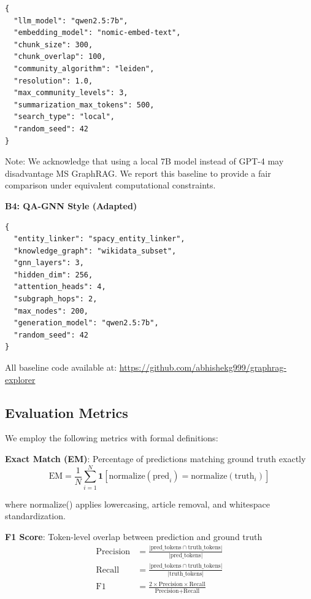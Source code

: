 \documentclass[conference]{IEEEtran}
\begin{document}
\begin{verbatim}
{
  "llm_model": "qwen2.5:7b",
  "embedding_model": "nomic-embed-text",
  "chunk_size": 300,
  "chunk_overlap": 100,
  "community_algorithm": "leiden",
  "resolution": 1.0,
  "max_community_levels": 3,
  "summarization_max_tokens": 500,
  "search_type": "local",
  "random_seed": 42
}
\end{verbatim}

Note: We acknowledge that using a local 7B model instead of GPT-4 may disadvantage MS GraphRAG. We report this baseline to provide a fair comparison under equivalent computational constraints.

\textbf{B4: QA-GNN Style (Adapted)}
\begin{verbatim}
{
  "entity_linker": "spacy_entity_linker",
  "knowledge_graph": "wikidata_subset",
  "gnn_layers": 3,
  "hidden_dim": 256,
  "attention_heads": 4,
  "subgraph_hops": 2,
  "max_nodes": 200,
  "generation_model": "qwen2.5:7b",
  "random_seed": 42
}
\end{verbatim}

All baseline code available at: \url{https://github.com/abhishekg999/graphrag-explorer}

\subsection{Evaluation Metrics}

We employ the following metrics with formal definitions:

\textbf{Exact Match (EM)}: Percentage of predictions matching ground truth exactly
\begin{equation}
    \text{EM} = \frac{1}{N} \sum_{i=1}^{N} \mathbf{1}[\text{normalize}(\text{pred}_i) = \text{normalize}(\text{truth}_i)]
\end{equation}

where normalize() applies lowercasing, article removal, and whitespace standardization.

\textbf{F1 Score}: Token-level overlap between prediction and ground truth
\begin{align}
    \text{Precision} &= \frac{|\text{pred\_tokens} \cap \text{truth\_tokens}|}{|\text{pred\_tokens}|} \\
    \text{Recall} &= \frac{|\text{pred\_tokens} \cap \text{truth\_tokens}|}{|\text{truth\_tokens}|} \\
    \text{F1} &= \frac{2 \times \text{Precision} \times \text{Recall}}{\text{Precision} + \text{Recall}}
\end{align}
\end{document}
